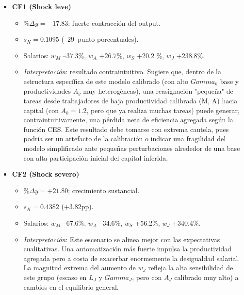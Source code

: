 \documentclass{article}
\theoremstyle{remark}
\theoremstyle{definition}
\begin{document}
\begin{enumerate}
\begin{tcolorbox}[title= Soluci\'on 7]
\begin{enumerate}[label=(\alph*)]
\begin{itemize}
  \item \textbf{CF1 (Shock leve)}
    \begin{itemize}
      \item $\%\Delta y = -17.83$; fuerte contracción del output.
      \item $s_K = 0.1095$ (–29\, punto porcentuales).
      \item Salarios: $w_M$ –37.3\%, $w_A$ +26.7\%, $w_S$ +20.2 \%, $w_J$ +238.8\%.
      \item \emph{Interpretación}: resultado contraintuitivo. Sugiere que, dentro de la estructura específica de este modelo calibrado (con alto $Gamma_k$ base y productividades $A_g$ muy heterogéneas), una reasignación "pequeña" de tareas desde trabajadores de baja productividad calibrada (M, A) hacia capital (con $A_k=1.2$, pero que ya realiza muchas tareas) puede generar, contraintuitivamente, una pérdida neta de eficiencia agregada según la función CES. Este resultado debe tomarse con extrema cautela, pues podría ser un artefacto de la calibración o indicar una fragilidad del modelo simplificado ante pequeñas perturbaciones alrededor de una base con alta participación inicial del capital inferida.
    \end{itemize}

  \item \textbf{CF2 (Shock severo)}
    \begin{itemize}
      \item $\%\Delta y = +21.80$; crecimiento sustancial.
      \item $s_K = 0.4382$ (+3.82pp).
      \item Salarios: $w_M$ –67.6\%, $w_A$ –34.6\%, $w_S$ +56.2\%, $w_J$ +340.4\%.
      \item \emph{Interpretación}: Este escenario se alinea mejor con las expectativas cualitativas. Una automatizaci\'on m\'as fuerte impulsa la productividad agregada pero a costa de exacerbar enormemente la desigualdad salarial. La magnitud extrema del aumento de $w_J$ refleja la alta sensibilidad de este grupo (escaso en $L_J$ y $Gamma_J$, pero con $A_J$ calibrado muy alto) a cambios en el equilibrio general.
    \end{itemize}


\end{itemize}
\end{enumerate}
\end{tcolorbox}
\end{enumerate}
\end{document}
